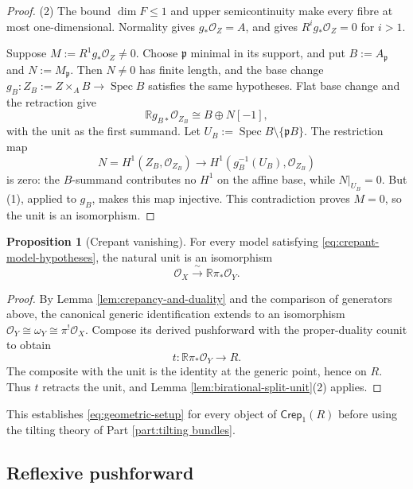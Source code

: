 \documentclass[a4paper,reqno]{amsart}
\def\O{\mathcal{O}}
\DeclareMathOperator{\Spec}{Spec}
\theoremstyle{definition}
\newtheorem{Prop}[Thm]{Proposition}
\begin{document}
\begin{proof}
(2) The bound $\dim F\le1$ and upper semicontinuity make every fibre at most one-dimensional. Normality gives $g_*\O_Z=A$, and \cite[Tag 02V7]{stacks-project} gives $R^ig_*\O_Z=0$ for $i>1$.

Suppose $M:=R^1g_*\O_Z\ne0$. Choose $\mathfrak p$ minimal in its support, and put $B:=A_{\mathfrak p}$ and $N:=M_{\mathfrak p}$. Then $N\ne0$ has finite length, and the base change $g_B\colon Z_B:=Z\times_A B\to\Spec B$ satisfies the same hypotheses. Flat base change and the retraction give
\begin{equation}\label{eq:split-birational-unit}
\mathbb Rg_{B*}\O_{Z_B}\cong B\oplus N[-1],
\end{equation}
with the unit as the first summand. Let $U_B:=\Spec B\setminus\{\mathfrak pB\}$. The restriction map
\[
N=H^1(Z_B,\O_{Z_B})\longrightarrow H^1(g_B^{-1}(U_B),\O_{Z_B})
\]
is zero: the $B$-summand contributes no $H^1$ on the affine base, while $N|_{U_B}=0$. But (1), applied to $g_B$, makes this map injective. This contradiction proves $M=0$, so the unit is an isomorphism.
\end{proof}

\begin{Prop}[Crepant vanishing]\label{prop:crepant-vanishing}
For every model satisfying \eqref{eq:crepant-model-hypotheses}, the natural unit is an isomorphism
\begin{equation}\label{eq:crepant-structure-vanishing}
\O_X\xrightarrow{\ \sim\ }\mathbb R\pi_*\O_Y.
\end{equation}
\end{Prop}
\begin{proof}
By Lemma \ref{lem:crepancy-and-duality} and the comparison of generators above, the canonical generic identification extends to an isomorphism $\O_Y\cong\omega_Y\cong\pi^!\O_X$. Compose its derived pushforward with the proper-duality counit to obtain
\[
t\colon\mathbb R\pi_*\O_Y\longrightarrow R.
\]
The composite with the unit is the identity at the generic point, hence on $R$. Thus $t$ retracts the unit, and Lemma \ref{lem:birational-split-unit}(2) applies.
\end{proof}

This establishes \eqref{eq:geometric-setup} for every object of $\mathsf{Crep}_1(R)$ before using the tilting theory of Part \ref{part:tilting bundles}.

\subsection{Reflexive pushforward}
\end{document}
